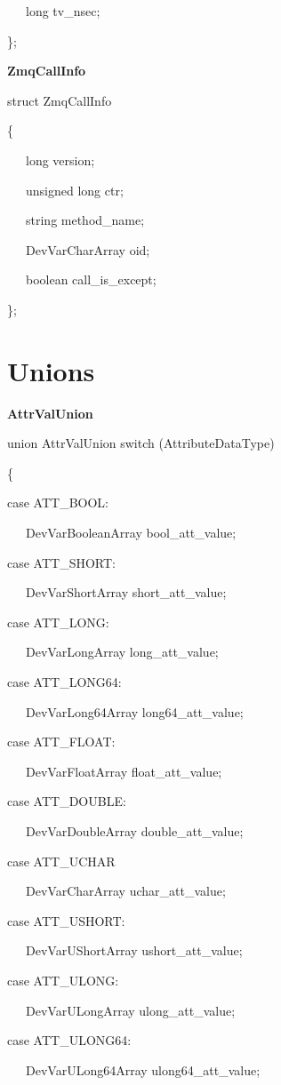 ~~~long tv\_nsec;

\};\\


\begin{flushleft}
\textbf{ZmqCallInfo}
\par\end{flushleft}

struct ZmqCallInfo

\{

~~~long version;

~~~unsigned long ctr;

~~~string method\_name;

~~~DevVarCharArray oid;

~~~boolean call\_is\_except;

\};


\section{Unions}

\textbf{AttrValUnion}

union AttrValUnion switch (AttributeDataType)

\{

case ATT\_BOOL:

~~~DevVarBooleanArray bool\_att\_value;

case ATT\_SHORT:

~~~DevVarShortArray short\_att\_value;

case ATT\_LONG:

~~~DevVarLongArray long\_att\_value;

case ATT\_LONG64:

~~~DevVarLong64Array long64\_att\_value;

case ATT\_FLOAT:

~~~DevVarFloatArray float\_att\_value;

case ATT\_DOUBLE:

~~~DevVarDoubleArray double\_att\_value;

case ATT\_UCHAR

~~~DevVarCharArray uchar\_att\_value;

case ATT\_USHORT:

~~~DevVarUShortArray ushort\_att\_value;

case ATT\_ULONG:

~~~DevVarULongArray ulong\_att\_value;

case ATT\_ULONG64:

~~~DevVarULong64Array ulong64\_att\_value;

